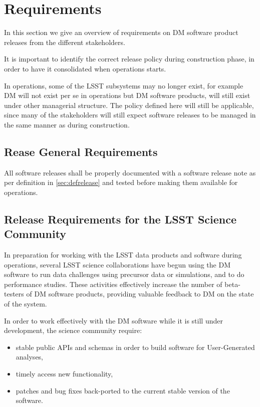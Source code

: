 \section{Requirements} \label{sec:reqs}

In this section we give an overview of requirements on \gls{DM} software product releases from the different stakeholders.

It is important to identify the correct release policy during construction phase, in order to have it consolidated when operations starts.

In operations, some of the \gls{LSST} subsystems may no longer exist, for example \gls{DM} will not exist per se in operations but \gls{DM} software products, will still exist under other managerial structure.
The policy defined here will still be applicable, since many of the stakeholders will still expect software releases to be managed in the same manner as during construction.


\subsection{Rease General Requirements} \label{sec:genreq}

All software releases shall be properly documented with a software release note as per definition in \ref{sec:defrelease} and tested before making them available for operations.


\subsection{Release Requirements for the \gls{LSST} Science Community} \label{sec:comreqs}

In preparation for working with the \gls{LSST} data products and software during operations, several \gls{LSST} science collaborations have begun using the \gls{DM} software to run data challenges using precursor data or simulations, and to do performance studies. These activities effectively increase the number of beta-testers of \gls{DM} software products, providing valuable feedback to \gls{DM} on the state of the system. 

In order to work effectively with the \gls{DM} software while it is still under development, the science community require: 
\begin{itemize}
\item stable public APIs and schemas in order to build software for User-Generated analyses, 
\item timely access new functionality,  
\item patches and bug fixes back-ported to the current stable version of the software. 
\end{itemize}

